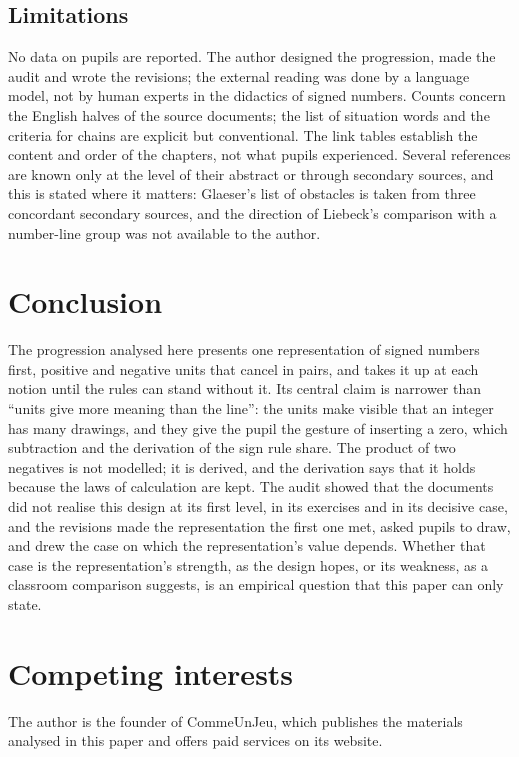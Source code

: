 \documentclass[11pt,a4paper]{article}
\theoremstyle{definition}
\begin{document}
\subsection{Limitations}
No data on pupils are reported. The author designed the progression, made the audit and wrote the revisions; the external reading was done by a language model, not by human experts in the didactics of signed numbers. Counts concern the English halves of the source documents; the list of situation words and the criteria for chains are explicit but conventional. The link tables establish the content and order of the chapters, not what pupils experienced. Several references are known only at the level of their abstract or through secondary sources, and this is stated where it matters: Glaeser's list of obstacles is taken from three concordant secondary sources, and the direction of Liebeck's comparison with a number-line group was not available to the author.

\section{Conclusion}\label{sec:conclusion}

The progression analysed here presents one representation of signed numbers first, positive and negative units that cancel in pairs, and takes it up at each notion until the rules can stand without it. Its central claim is narrower than ``units give more meaning than the line'': the units make visible that an integer has many drawings, and they give the pupil the gesture of inserting a zero, which subtraction and the derivation of the sign rule share. The product of two negatives is not modelled; it is derived, and the derivation says that it holds because the laws of calculation are kept. The audit showed that the documents did not realise this design at its first level, in its exercises and in its decisive case, and the revisions made the representation the first one met, asked pupils to draw, and drew the case on which the representation's value depends. Whether that case is the representation's strength, as the design hopes, or its weakness, as a classroom comparison suggests, is an empirical question that this paper can only state.

\section*{Competing interests}
The author is the founder of CommeUnJeu, which publishes the materials analysed in this paper and offers paid services on its website.
\end{document}
